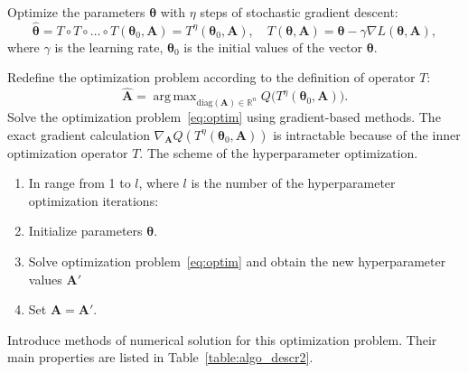 \documentclass[smallcondensed]{svjour3}
\DeclareMathOperator*{\argmax}{arg\,max}
\begin{document}
Optimize the parameters  $\boldsymbol{\theta}$ with $\eta$ steps of stochastic gradient descent:
\begin{equation}
\label{eq:gd}
	 \hat{\boldsymbol{\theta}} = T \circ T \circ \dots \circ T(\boldsymbol{\theta}_0, \mathbf{A}) = T^\eta(\boldsymbol{\theta}_0, \mathbf{A}), \quad 	T(\boldsymbol{\theta}, \mathbf{A}) =\boldsymbol{\theta} - \gamma \nabla L(\boldsymbol{\theta}, \mathbf{A}), 
\end{equation}
where $\gamma$ is the learning rate, $\boldsymbol{\theta}_0$ is the initial values of the vector $\boldsymbol{\theta}$. 

Redefine the optimization problem according to the definition of operator $T$:
\begin{equation}
\label{eq:optim}
	\hat{\mathbf{A}} = \argmax_{\text{diag}(\mathbf{A}) \in \mathbb{R}^n} Q\bigl( T^\eta(\boldsymbol{\theta}_0, \mathbf{A})\bigr).
\end{equation}
Solve the optimization problem~\eqref{eq:optim} using gradient-based methods. The exact gradient calculation $\nabla_{\mathbf{A}} Q( T^\eta(\boldsymbol{\theta}_0, \mathbf{A}))$ is intractable because of the inner optimization operator $T$. The scheme of the hyperparameter optimization.
\begin{enumerate}
\item In range from 1 to  $l$, where $l$ is the number of the hyperparameter optimization iterations:
\item Initialize parameters $\boldsymbol{\theta}$.
\item Solve optimization problem~\eqref{eq:optim} and obtain the new hyperparameter values $\mathbf{A}'$
\item Set $\mathbf{A} = \mathbf{A}'$.
\end{enumerate}

Introduce methods of numerical solution for this optimization problem. Their main properties are listed in Table~\ref{table:algo_descr2}.
\end{document}
